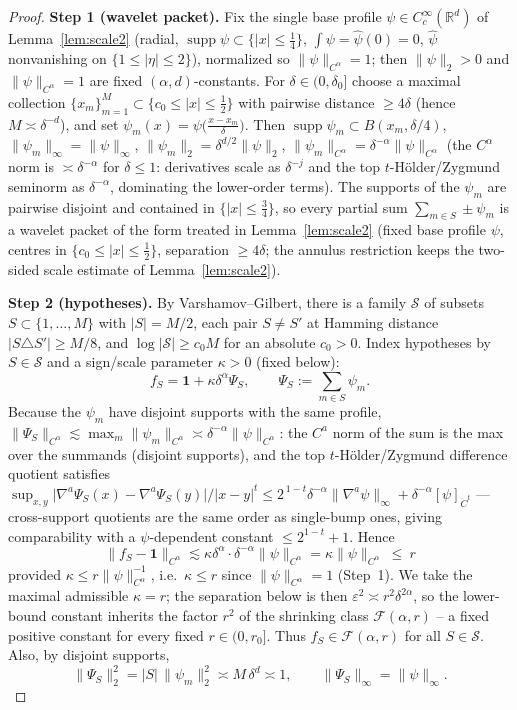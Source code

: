 \documentclass[11pt]{article}
\theoremstyle{remark}
\newcommand{\R}{\mathbb{R}}
\newcommand{\F}{\mathcal{F}}
\newcommand{\one}{\mathbf{1}}
\newcommand{\norm}[1]{\lVert #1\rVert}
\newcommand{\abs}[1]{\lvert #1\rvert}
\newcommand{\SET}[1]{\{#1\}}
\DeclareMathOperator{\supp}{supp}
\begin{document}
\begin{proof}
\textbf{Step 1 (wavelet packet).} Fix the single base profile
$\psi\in C^\infty_c(\R^{d})$ of Lemma~\ref{lem:scale2} (radial,
$\supp\psi\subset\SET{\abs x\le\tfrac14}$, $\int\psi=\widehat\psi(0)=0$,
$\widehat\psi$ nonvanishing on $\SET{1\le\abs\eta\le2}$), normalized so
$\norm{\psi}_{C^\alpha}=1$; then $\norm{\psi}_2>0$ and
$\norm\psi_{C^\alpha}=1$ are fixed $(\alpha,d)$-constants. For $\delta\in(0,\delta_0]$ choose a maximal
collection $\SET{x_m}_{m=1}^{M}\subset\SET{c_0\le\abs{x}\le\tfrac12}$ with
pairwise distance $\ge4\delta$ (hence $M\asymp\delta^{-d}$), and set
$\psi_m(x)=\psi\bigl(\tfrac{x-x_m}{\delta}\bigr)$. Then
$\supp\psi_m\subset B(x_m,\delta/4)$,
$\norm{\psi_m}_\infty=\norm{\psi}_\infty$,
$\norm{\psi_m}_2=\delta^{d/2}\norm{\psi}_2$,
$\norm{\psi_m}_{C^\alpha}=\delta^{-\alpha}\norm{\psi}_{C^\alpha}$ (the
$C^\alpha$ norm is $\asymp\delta^{-\alpha}$ for $\delta\le1$: derivatives
scale as $\delta^{-j}$ and the top $t$-H\"older/Zygmund seminorm as
$\delta^{-\alpha}$, dominating the lower-order terms).
The supports of the $\psi_m$ are pairwise disjoint and contained in
$\SET{\abs x\le\tfrac34}$, so every partial sum
$\sum_{m\in S}\pm\psi_m$ is a wavelet packet of the form treated in
Lemma~\ref{lem:scale2} (fixed base profile $\psi$, centres in
$\SET{c_0\le\abs{x}\le\tfrac12}$, separation $\ge4\delta$; the annulus
restriction keeps the two-sided scale estimate of
Lemma~\ref{lem:scale2}).

\textbf{Step 2 (hypotheses).} By Varshamov--Gilbert, there is a family
$\mathcal S$ of subsets $S\subset\SET{1,\dots,M}$ with $\abs S=M/2$, each
pair $S\ne S'$ at Hamming distance $\abs{S\triangle S'}\ge M/8$, and
$\log\abs{\mathcal S}\ge c_0 M$ for an absolute $c_0>0$. Index hypotheses
by $S\in\mathcal S$ and a sign/scale parameter $\kappa>0$ (fixed below):
\[
f_S=\one+\kappa\delta^{\alpha}\Psi_S,
\qquad\Psi_S:=\sum_{m\in S}\psi_m .
\]
Because the $\psi_m$ have disjoint supports with the same profile,
$\norm{\Psi_S}_{C^\alpha}\lesssim\max_{m}\norm{\psi_m}_{C^\alpha}
\asymp\delta^{-\alpha}\norm{\psi}_{C^\alpha}$: the $C^a$ norm of the sum is
the max over the summands (disjoint supports), and the top
$t$-H\"older/Zygmund difference quotient satisfies
$\sup_{x,y}\abs{\nabla^{a}\Psi_S(x)-\nabla^{a}\Psi_S(y)}/\abs{x-y}^{t}
\le 2^{\,1-t}\delta^{-\alpha}\norm{\nabla^{a}\psi}_{\infty}
+\delta^{-\alpha}[\psi]_{\dot C^{t}}$ — cross-support quotients are the
same order as single-bump ones, giving comparability with a
$\psi$-dependent constant $\le 2^{1-t}+1$. Hence
\[
\norm{f_S-\one}_{C^\alpha}
\lesssim\kappa\delta^{\alpha}\cdot\delta^{-\alpha}\norm{\psi}_{C^\alpha}
=\kappa\norm{\psi}_{C^\alpha}\ \le\ r
\]
provided $\kappa\le r\norm{\psi}_{C^\alpha}^{-1}$, i.e.\ $\kappa\le r$
since $\norm{\psi}_{C^\alpha}=1$ (Step~1). We take the maximal admissible
$\kappa=r$; the separation below is then $\varepsilon^{2}\asymp
r^{2}\delta^{2\alpha}$, so the lower-bound constant inherits the factor
$r^{2}$ of the shrinking class $\F(\alpha,r)$ -- a fixed positive constant
for every fixed $r\in(0,r_0]$. Thus $f_S\in\F(\alpha,r)$ for all
$S\in\mathcal S$. Also, by disjoint supports,
\[
\norm{\Psi_S}_2^{2}=\abs S\,\norm{\psi_m}_2^{2}\asymp M\,\delta^{d}\asymp1,
\qquad
\norm{\Psi_S}_{\infty}=\norm{\psi}_{\infty}.
\]


\end{proof}
\end{document}
